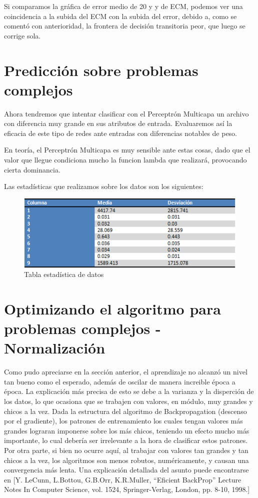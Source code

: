 \documentclass[12pt]{article}
\begin{document}
Si comparamos la gráfica de error medio de 20 y y de ECM, podemos ver una coincidencia a la subida del ECM con la subida del error, debido a, como se comentó con anterioridad, la frontera de decisión transitoria peor, que luego se corrige sola.

\newpage
\section{Predicción sobre problemas complejos}

Ahora tendremos que intentar clasificar con el Perceptrón Multicapa un archivo con diferencia muy grande en sus atributos de entrada. Evaluaremos así la eficacia de este tipo de redes ante entradas con diferencias notables de peso.

En teoría, el Perceptrón Multicapa es muy sensible ante estas cosas, dado que el valor que llegue condiciona mucho la funcion lambda que realizará, provocando cierta dominancia.

Las estadísticas que realizamos sobre los datos son los siguientes:
\begin{figure}[!ht]
\centering
   \includegraphics[width=\textwidth]{recursos/tabla}
            \caption{Tabla estadística de datos}
            \label{fig:stat_pr4}
\end{figure}
\newpage
\section{Optimizando el algoritmo para problemas complejos - Normalizaci\'on}

Como pudo apreciarse en la sección anterior, el aprendizaje no alcanzó un nivel tan bueno como el esperado, además de oscilar de manera increible época a época. La explicación más precisa de esto se debe a la varianza y la disperción de los datos, lo que ocasiona que se trabajen con valores, en módulo, muy grandes y chicos a la vez. Dada la estructura del algoritmo de Backpropagation (descenso por el gradiente), los patrones de entrenamiento los cuales tengan valores más grandes lograran imponerse sobre los más chicos, teniendo un efecto mucho más importante, lo cual debería ser irrelevante a la hora de clasificar estos patrones. Por otra parte, si bien no ocurre aquí, al trabajar con valores tan grandes y tan chicos a la vez, los algoritmos son menos robutos, numéricamente, y causan una convergencia más lenta. Una explicación detallada del asunto puede encontrarse en [Y. LeCunn, L.Bottou, G.B.Orr, K.R.Muller, “Eficient BackProp” Lecture Notes In Computer Science, vol. 1524, Springer-Verlag, London, pp. 8-10, 1998.]
\end{document}
